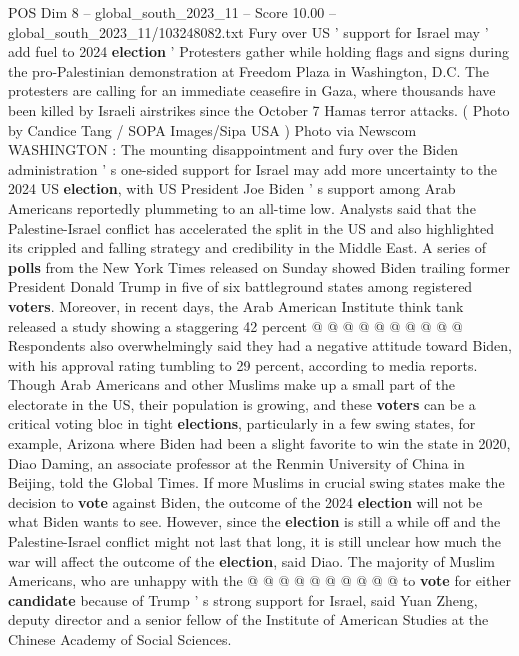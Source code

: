 \begin{textsample}{POS Dim 8 – global\_south\_2023\_11 – Score 10.00 – global\_south\_2023\_11/103248082.txt}  \label{ex:f8_pos_269}
Fury over US ' support for Israel may ' add fuel to 2024 \textbf{election} ' Protesters gather while holding flags and signs during the pro-Palestinian demonstration at Freedom Plaza in Washington, D.C.
The protesters are calling for an immediate ceasefire in Gaza, where thousands have been killed by Israeli airstrikes since the October 7 Hamas terror attacks. ( Photo by Candice Tang / SOPA Images/Sipa USA ) Photo via Newscom WASHINGTON : The mounting disappointment and fury over the Biden administration ' s one-sided support for Israel may add more uncertainty to the 2024 US \textbf{election}, with US President Joe Biden ' s support among Arab Americans reportedly plummeting to an all-time low.
Analysts said that the Palestine-Israel conflict has accelerated the split in the US and also highlighted its crippled and falling strategy and credibility in the Middle East.
A series of \textbf{polls} from the New York Times released on Sunday showed Biden trailing former President Donald Trump in five of six battleground states among registered \textbf{voters}.
Moreover, in recent days, the Arab American Institute think tank released a study showing a staggering 42 percent @ @ @ @ @ @ @ @ @ @ Respondents also overwhelmingly said they had a negative attitude toward Biden, with his approval rating tumbling to 29 percent, according to media reports.
Though Arab Americans and other Muslims make up a small part of the electorate in the US, their population is growing, and these \textbf{voters} can be a critical voting bloc in tight \textbf{elections}, particularly in a few swing states, for example, Arizona where Biden had been a slight favorite to win the state in 2020, Diao Daming, an associate professor at the Renmin University of China in Beijing, told the Global Times.
If more Muslims in crucial swing states make the decision to \textbf{vote} against Biden, the outcome of the 2024 \textbf{election} will not be what Biden wants to see.
However, since the \textbf{election} is still a while off and the Palestine-Israel conflict might not last that long, it is still unclear how much the war will affect the outcome of the \textbf{election}, said Diao.
The majority of Muslim Americans, who are unhappy with the @ @ @ @ @ @ @ @ @ @ to \textbf{vote} for either \textbf{candidate} because of Trump ' s strong support for Israel, said Yuan Zheng, deputy director and a senior fellow of the Institute of American Studies at the Chinese Academy of Social Sciences.

\end{textsample}
